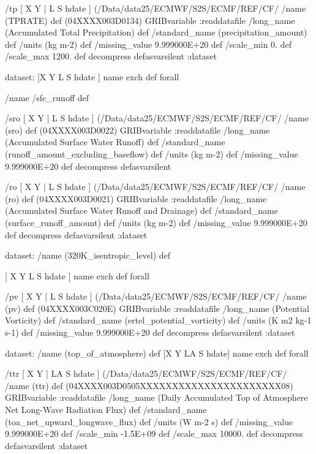 \begin{ingrid}
{/tp { [ X Y | L S hdate ] (/Data/data25/ECMWF/S2S/ECMF/REF/CF/%
/name (TPRATE) def
(04XXXX003D0134) GRIBvariable
:readdatafile
/long_name (Accumulated Total Precipitation) def
/standard_name (precipitation_amount) def 
/units (kg m-2) def
/missing_value 9.999000E+20 def
/scale_min 0. def
/scale_max 1200. def
decompress
} defasvarsilent
:dataset

dataset:
[X Y L S hdate ] {name exch def } forall

/name /sfc_runoff def

/sro { [ X Y | L S hdate ] (/Data/data25/ECMWF/S2S/ECMF/REF/CF/%
/name (sro) def
(04XXXX003D0022) GRIBvariable
:readdatafile
/long_name (Accumulated Surface Water Runoff) def
/standard_name (runoff_amount_excluding_baseflow) def
/units (kg m-2) def
/missing_value 9.999000E+20 def
decompress
} defasvarsilent

/ro { [ X Y | L S hdate ] (/Data/data25/ECMWF/S2S/ECMF/REF/CF/%
/name (ro) def
(04XXXX003D0021) GRIBvariable
:readdatafile
/long_name (Accumulated Surface Water Runoff and Drainage) def
/standard_name (surface_runoff_amount) def
/units (kg m-2) def
/missing_value 9.999000E+20 def
decompress
} defasvarsilent
:dataset

dataset:
/name (320K_isentropic_level) def

[ X Y L S hdate ] { name exch def } forall

/pv { [ X Y | L S hdate ] (/Data/data25/ECMWF/S2S/ECMF/REF/CF/%
/name (pv) def
(04XXXX003C020E) GRIBvariable
:readdatafile
/long_name (Potential Vorticity) def
/standard_name (ertel_potential_vorticity) def
/units (K m2 kg-1 s-1) def
/missing_value 9.999000E+20 def
decompress
} defasvarsilent
:dataset

dataset:
/name (top_of_atmosphere) def
[X Y LA S hdate] {name exch def } forall

/ttr { [ X Y | LA S hdate ] (/Data/data25/ECMWF/S2S/ECMF/REF/CF/%
/name (ttr) def
(04XXXX003D0505XXXXXXXXXXXXXXXXXXXXXX08) GRIBvariable
:readdatafile
/long_name (Daily Accumulated Top of Atmosphere Net Long-Wave Radiation Flux) def
/standard_name (toa_net_upward_longwave_flux) def
/units (W m-2 s) def
/missing_value 9.999000E+20 def
/scale_min -1.5E+09 def
/scale_max 10000. def
decompress
} defasvarsilent
:dataset

}
\end{ingrid}
